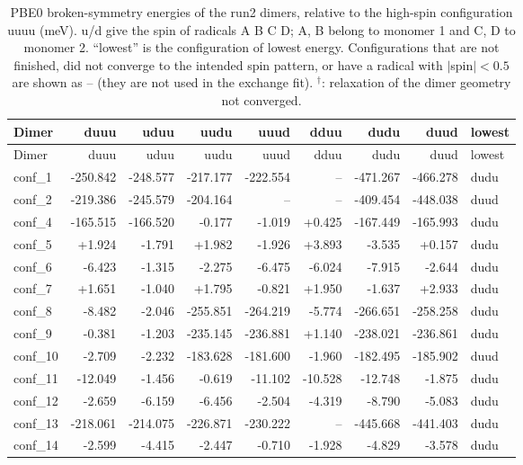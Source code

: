 
\begin{longtable}{@{}lrrrrrrrl@{}}
\caption{PBE0 broken-symmetry energies of the run2 dimers, relative to the high-spin
         configuration uuuu (meV). u/d give the spin of radicals A B C D; A, B belong to monomer 1 and
         C, D to monomer 2. ``lowest'' is the configuration of lowest energy. Configurations that are not
         finished, did not converge to the intended spin pattern, or have a radical with $|$spin$|<0.5$ are
         shown as -- (they are not used in the exchange fit).
         $^{\dagger}$: relaxation of the dimer geometry not converged.}\label{tab:run2_bs_energies}\\
\toprule
Dimer & duuu & uduu & uudu & uuud & dduu & dudu & duud & lowest \\
\midrule
\endfirsthead
\toprule
Dimer & duuu & uduu & uudu & uuud & dduu & dudu & duud & lowest \\
\midrule
\endhead
\bottomrule
\endlastfoot
conf\_1 & -250.842 & -248.577 & -217.177 & -222.554 & -- & -471.267 & -466.278 & dudu \\
conf\_2 & -219.386 & -245.579 & -204.164 & -- & -- & -409.454 & -448.038 & duud \\
conf\_4 & -165.515 & -166.520 & -0.177 & -1.019 & +0.425 & -167.449 & -165.993 & dudu \\
conf\_5 & +1.924 & -1.791 & +1.982 & -1.926 & +3.893 & -3.535 & +0.157 & dudu \\
conf\_6 & -6.423 & -1.315 & -2.275 & -6.475 & -6.024 & -7.915 & -2.644 & dudu \\
conf\_7 & +1.651 & -1.040 & +1.795 & -0.821 & +1.950 & -1.637 & +2.933 & dudu \\
conf\_8 & -8.482 & -2.046 & -255.851 & -264.219 & -5.774 & -266.651 & -258.258 & dudu \\
conf\_9 & -0.381 & -1.203 & -235.145 & -236.881 & +1.140 & -238.021 & -236.861 & dudu \\
conf\_10 & -2.709 & -2.232 & -183.628 & -181.600 & -1.960 & -182.495 & -185.902 & duud \\
conf\_11 & -12.049 & -1.456 & -0.619 & -11.102 & -10.528 & -12.748 & -1.875 & dudu \\
conf\_12 & -2.659 & -6.159 & -6.456 & -2.504 & -4.319 & -8.790 & -5.083 & dudu \\
conf\_13 & -218.061 & -214.075 & -226.871 & -230.222 & -- & -445.668 & -441.403 & dudu \\
conf\_14 & -2.599 & -4.415 & -2.447 & -0.710 & -1.928 & -4.829 & -3.578 & dudu \\

\end{longtable}

